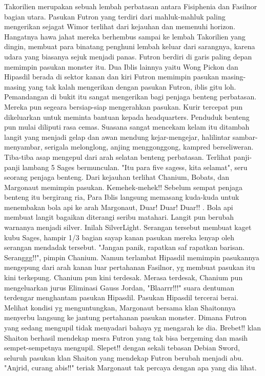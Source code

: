 \documentclass[a4paper,11pt,final]{article}
\begin{document}
Takorilien merupakan sebuah lembah perbatasan antara Fisiphenia dan Fasilnor bagian utara. Pasukan Futron yang terdiri dari mahluk-mahluk paling mengerikan sejagat Wimor terlihat dari kejauhan dan memenuhi horizon.
Hangatnya hawa jahat mereka berhembus sampai ke lembah Takorilien yang dingin, membuat para binatang penghuni lembah keluar dari sarangnya, karena udara yang biasanya sejuk menjadi panas.
Futron berdiri di garis paling depan memimpin pasukan monster itu. Dua Iblis lainnya yaitu Wong Pickon dan Hipasdil berada di sektor kanan dan kiri Futron memimpin pasukan masing-masing yang tak kalah mengerikan dengan pasukan Futron, iblis gitu loh.
Pemandangan di bukit itu sangat mengerikan bagi penjaga benteng perbatasan. Mereka pun segeara bersiap-siap mengerahkan pasukan. Kurir tercepat pun dikeluarkan untuk meminta bantuan kepada headquarters. Penduduk benteng pun mulai diliputi rasa cemas.
Suasana sangat mencekam kelam itu ditambah langit yang menjadi gelap dan awan mendung kejar-mengejar, halilintar sambar-menyambar, serigala melonglong, anjing menggonggong, kampred berseliweran.
Tiba-tiba asap mengepul dari arah selatan benteng perbatasan. Terlihat panji-panji lambang 5 Sages bermunculan. "Itu para five sagess, kita selamat", seru seorang penjaga benteng. Dari kejauhan terlihat Chanium, Bobats, dan Margonaut memimpin pasukan.
Kemehek-mehek!! Sebelum sempat penjaga benteng itu bergirang ria, Para Iblis langsung memasang kuda-kuda untuk menembakan bola api ke arah Margonaut, Duar! Duar! Duar!! .
Bola api membuat langit bagaikan diterangi seribu matahari. Langit pun berubah warnanya menjadi silver. Inilah SilverLight.
Serangan tersebut membuat kaget kubu Sages, hampir 1/3 bagian sayap kanan pasukan mereka lenyap oleh serangan mendadak tersebut. "Jangan panik, rapatkan saf rapatkan barisan. Seranggg!!", pimpin Chanium.
Namun terlambat Hipasdil memimpin pasukannya mengepung dari arah kanan luar pertahanan Fasilnor, yg membuat pasukan itu kini terkepung. Chanium pun kini terdesak.
Merasa terdesak, Chanium pun mengeluarkan jurus Eliminasi Gauss Jordan, "Blaarrr!!!" suara dentuman terdengar menghantam pasukan Hipasdil. Pasukan Hipasdil tercerai berai.
Melihat kondisi yg menguntungkan, Margonaut bersama klan Shaitonnya menyerbu langsung ke jantung pertahanan pasukan monster. Dimana Futron yang sedang mengupil tidak menyadari bahaya yg mengarah ke dia.
Brebet!! klan Shaiton berhasil mendekap mesra Futron yang tak bisa bergeming dan masih sempet-sempetnya mengupil.
Slepet!! dengan sekali tebasan Debian Sword, seluruh pasukan klan Shaiton yang mendekap Futron berubah menjadi abu. "Anjrid, curang abis!!" teriak Margonaut tak percaya dengan apa yang dia lihat.
\end{document}
